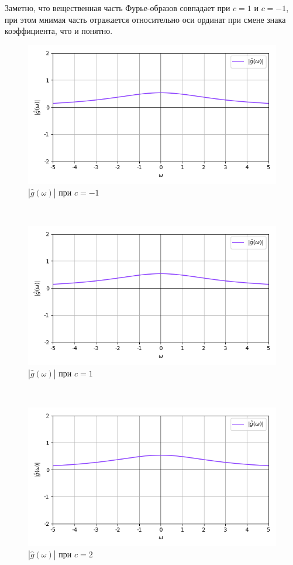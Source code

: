 \documentclass[a4paper]{article}
\begin{document}
Заметно, что вещественная часть Фурье-образов совпадает при $c=1$ и $c=-1$, при этом мнимая часть отражается относительно оси ординат при смене знака коэффициента, что и понятно.

\begin{figure}[H]
        \centering \includegraphics[width=\textwidth]{complex/complex_abs_2_3_-1.png}
        \caption{$|\hat{g}(\omega)|$ при $c = -1$}
\end{figure}\noindent\
\begin{figure}[H]
        \centering \includegraphics[width=\textwidth]{complex/complex_abs_2_3_1.png}
        \caption{$|\hat{g}(\omega)|$ при $c = 1$}
\end{figure}\noindent\
\begin{figure}[H]
        \centering \includegraphics[width=\textwidth]{complex/complex_abs_2_3_2.png}
        \caption{$|\hat{g}(\omega)|$ при $c = 2$}
\end{figure}\noindent\
\end{document}
